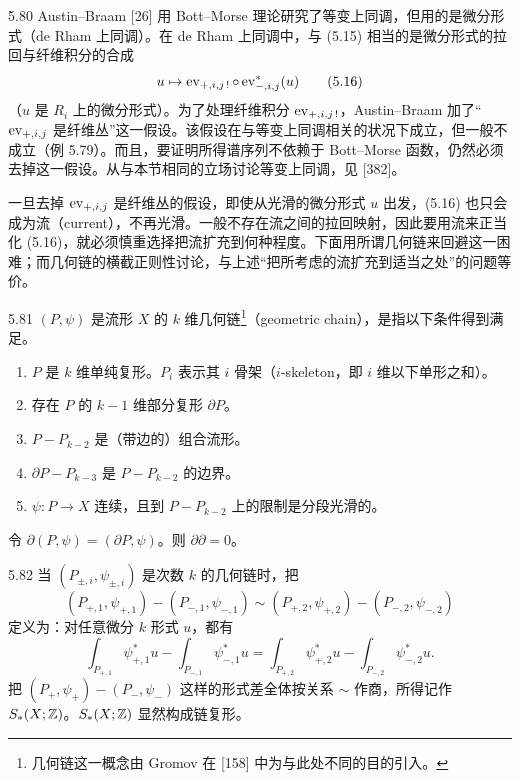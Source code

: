 \begin{remark}{5.80}
  Austin–Braam [26] 用 Bott–Morse 理论研究了等变上同调，但用的是微分形式（de Rham 上同调）。在 de Rham 上同调中，与 (5.15) 相当的是微分形式的拉回与纤维积分的合成
  \begin{equation}
    u\mapsto \operatorname{ev}_{+,i,j\,!}\circ\operatorname{ev}^{*}_{-,i,j}(u) \tag{5.16}
  \end{equation}
  （$u$ 是 $R_i$ 上的微分形式）。为了处理纤维积分 $\operatorname{ev}_{+,i,j\,!}$，Austin–Braam 加了“$\operatorname{ev}_{+,i,j}$ 是纤维丛”这一假设。该假设在与等变上同调相关的状况下成立，但一般不成立（例 5.79）。而且，要证明所得谱序列不依赖于 Bott–Morse 函数，仍然必须去掉这一假设。从与本节相同的立场讨论等变上同调，见 [382]。

  一旦去掉 $\operatorname{ev}_{+,i,j}$ 是纤维丛的假设，即使从光滑的微分形式 $u$ 出发，(5.16) 也只会成为流（current），不再光滑。一般不存在流之间的拉回映射，因此要用流来正当化 (5.16)，就必须慎重选择把流扩充到何种程度。下面用所谓几何链来回避这一困难；而几何链的横截正则性讨论，与上述“把所考虑的流扩充到适当之处”的问题等价。
\end{remark}

\begin{definition}{5.81}
  $(P,\psi)$ 是流形 $X$ 的 $k$ 维几何链\footnote{几何链这一概念由 Gromov 在 [158] 中为与此处不同的目的引入。}（geometric chain），是指以下条件得到满足。

  \begin{enumerate}[label=(\arabic*),leftmargin=2.4em,itemsep=1pt,topsep=2pt]
    \item $P$ 是 $k$ 维单纯复形。$P_i$ 表示其 $i$ 骨架（$i$-skeleton，即 $i$ 维以下单形之和）。
    \item 存在 $P$ 的 $k-1$ 维部分复形 $\partial P$。
    \item $P-P_{k-2}$ 是（带边的）组合流形。
    \item $\partial P-P_{k-3}$ 是 $P-P_{k-2}$ 的边界。
    \item $\psi\colon P\to X$ 连续，且到 $P-P_{k-2}$ 上的限制是分段光滑的。
  \end{enumerate}
\end{definition}

令 $\partial(P,\psi)=(\partial P,\psi)$。则 $\partial\partial=0$。

\begin{definition}{5.82}
  当 $(P_{\pm,i},\psi_{\pm,i})$ 是次数 $k$ 的几何链时，把
  \[
    (P_{+,1},\psi_{+,1})-(P_{-,1},\psi_{-,1})\sim(P_{+,2},\psi_{+,2})-(P_{-,2},\psi_{-,2})
  \]
  定义为：对任意微分 $k$ 形式 $u$，都有
  \[
    \int_{P_{+,1}}\psi^{*}_{+,1}u-\int_{P_{-,1}}\psi^{*}_{-,1}u
    =\int_{P_{+,2}}\psi^{*}_{+,2}u-\int_{P_{-,2}}\psi^{*}_{-,2}u .
  \]
  把 $(P_+,\psi_+)-(P_-,\psi_-)$ 这样的形式差全体按关系 $\sim$ 作商，所得记作 $S_*(X;\mathbb{Z})$。$S_*(X;\mathbb{Z})$ 显然构成链复形。
\end{definition}

